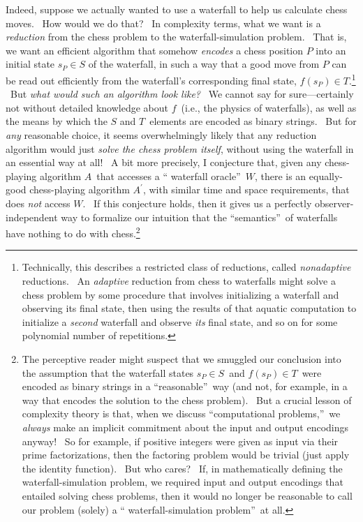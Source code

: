 \documentclass[11pt,onecolumn]{article}%
\begin{document}
Indeed, suppose we actually wanted to use a waterfall to help us calculate
chess moves. \ How would we do that? \ In complexity terms, what we want is a
\textit{reduction} from the chess problem to the waterfall-simulation problem.
\ That is, we want an efficient algorithm that somehow \textit{encodes} a
chess position $P$ into an initial state $s_{P}\in S$ of the waterfall, in
such a way that a good move from $P$ can be read out efficiently from the
waterfall's corresponding final state, $f\left(  s_{P}\right)  \in
T$.\footnote{Technically, this describes a restricted class of reductions,
called \textit{nonadaptive} reductions. \ An \textit{adaptive} reduction from
chess to waterfalls might solve a chess problem by some procedure that
involves initializing a waterfall and observing its final state, then using
the results of that aquatic computation to initialize a \textit{second}
waterfall and observe \textit{its} final state, and so on for some polynomial
number of repetitions.} \ But \textit{what would such an algorithm look like?}
\ We cannot say for sure---certainly not without detailed knowledge about
$f$\ (i.e., the physics of waterfalls), as well as the means by which the $S$
and $T$\ elements are encoded as binary strings. \ But for \textit{any}
reasonable choice, it seems overwhelmingly likely that any reduction algorithm
would just \textit{solve the chess problem itself}, without using the
waterfall in an essential way at all! \ A bit more precisely, I conjecture
that, given any chess-playing algorithm $A$\ that accesses a \textquotedblleft
waterfall oracle\textquotedblright\ $W$, there is an equally-good
chess-playing algorithm $A^{\prime}$, with similar time and space
requirements, that does \textit{not} access $W$. \ If this conjecture holds,
then it gives us a perfectly observer-independent way to formalize our
intuition that the \textquotedblleft semantics\textquotedblright\ of
waterfalls have nothing to do with chess.\footnote{The perceptive reader might
suspect that we smuggled our conclusion into the assumption that the waterfall
states $s_{P}\in S$\ and $f\left(  s_{P}\right)  \in T$\ were encoded as
binary strings in a \textquotedblleft reasonable\textquotedblright\ way (and
not, for example, in a way that encodes the solution to the chess problem).
\ But a crucial lesson of complexity theory is that, when we discuss
\textquotedblleft computational problems,\textquotedblright\ we
\textit{always} make an implicit commitment about the input and output
encodings anyway! \ So for example, if positive integers were given as input
via their prime factorizations, then the factoring problem would be trivial
(just apply the identity function). \ But who cares? \ If, in mathematically
defining the waterfall-simulation problem, we required input and output
encodings that entailed solving chess problems, then it would no longer be
reasonable to call our problem (solely) a \textquotedblleft
waterfall-simulation problem\textquotedblright\ at all.}
\end{document}

